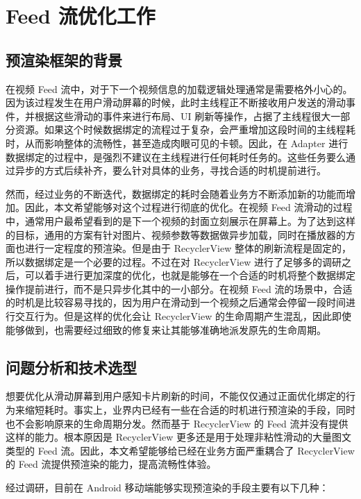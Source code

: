 \chapter{Feed 流优化工作}

\section{预渲染框架的背景}

在视频 Feed 流中，对于下一个视频信息的加载逻辑处理通常是需要格外小心的。因为该过程发生在用户滑动屏幕的时候，此时主线程正不断接收用户发送的滑动事件，并根据这些滑动的事件来进行布局、UI 刷新等操作，占据了主线程很大一部分资源。如果这个时候数据绑定的流程过于复杂，会严重增加这段时间的主线程耗时，从而影响整体的流畅性，甚至造成肉眼可见的卡顿。因此，在 Adapter 进行数据绑定的过程中，是强烈不建议在主线程进行任何耗时任务的。这些任务要么通过异步的方式后续补齐，要么针对具体的业务，寻找合适的时机提前进行。

然而，经过业务的不断迭代，数据绑定的耗时会随着业务方不断添加新的功能而增加。因此，本文希望能够对这个过程进行彻底的优化。在视频 Feed 流滑动的过程中，通常用户最希望看到的是下一个视频的封面立刻展示在屏幕上。为了达到这样的目标，通用的方案有针对图片、视频参数等数据做异步加载，同时在播放器的方面也进行一定程度的预渲染。但是由于 RecyclerView 整体的刷新流程是固定的，所以数据绑定是一个必要的过程。不过在对 RecyclerView 进行了足够多的调研之后，可以着手进行更加深度的优化，也就是能够在一个合适的时机将整个数据绑定操作提前进行，而不是只异步化其中的一小部分。在视频 Feed 流的场景中，合适的时机是比较容易寻找的，因为用户在滑动到一个视频之后通常会停留一段时间进行交互行为。但是这样的优化会让 RecyclerView 的生命周期产生混乱，因此即使能够做到，也需要经过细致的修复来让其能够准确地派发原先的生命周期。

\section{问题分析和技术选型}

想要优化从滑动屏幕到用户感知卡片刷新的时间，不能仅仅通过正面优化绑定的行为来缩短耗时。事实上，业界内已经有一些在合适的时机进行预渲染的手段，同时也不会影响原来的生命周期分发。然而基于 RecyclerView 的 Feed 流并没有提供这样的能力。根本原因是 RecyclerView 更多还是用于处理非粘性滑动的大量图文类型的 Feed 流。因此，本文希望能够给已经在业务方面严重耦合了 RecyclerView 的 Feed 流提供预渲染的能力，提高流畅性体验。

经过调研，目前在 Android 移动端能够实现预渲染的手段主要有以下几种：

